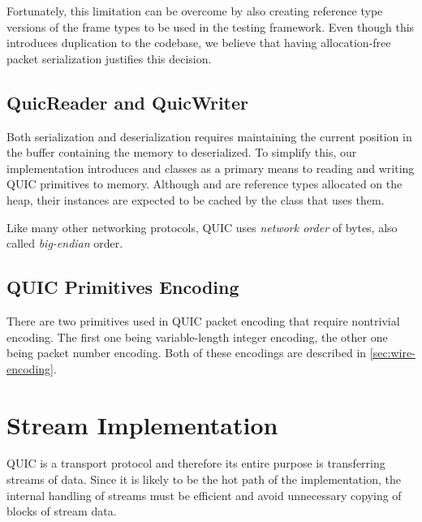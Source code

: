 
Fortunately, this limitation can be overcome by
also creating reference type versions of the frame types to be used in the testing framework. Even
though this introduces duplication to the codebase, we believe that having allocation-free packet
serialization justifies this decision.

\subsection{QuicReader and QuicWriter}

Both serialization and deserialization requires maintaining the current position in the buffer
containing the memory to deserialized. To simplify this, our implementation introduces \QuicReader{}
and \QuicWriter{} classes as a primary means to reading and writing QUIC primitives to memory.
Although \QuicReader{} and \QuicWriter{} are reference types allocated on the heap, their instances
are expected to be cached by the class that uses them.

 Like many
other networking protocols, QUIC uses \textit{network order} of bytes, also called
\textit{big-endian} order. 

\subsection{QUIC Primitives Encoding}

There are two primitives used in QUIC packet encoding that require nontrivial encoding. The first
one being variable-length integer encoding, the other one being packet number encoding. Both of
these encodings are described in \autoref{sec:wire-encoding}.


\section{Stream Implementation}

QUIC is a transport protocol and therefore its entire purpose is transferring streams of data. Since
it is likely to be the hot path of the implementation, the internal handling of streams must be
efficient and avoid unnecessary copying of blocks of stream data.

